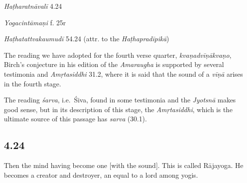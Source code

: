 \begin{ekdosis}
\begin{testimonia}[hp04_023]
\emph{Haṭharatnāvalī} 4.24
\begin{versinnote}
\end{versinnote} 

\emph{Yogacintāmaṇi} f. 25r
\begin{versinnote}
\end{versinnote}

\emph{Haṭhatattvakaumudī} 54.24 (attr. to the \emph{Haṭhapradīpikā})
\begin{versinnote}
\end{versinnote}
\end{testimonia}

\begin{philcomm}[hp04_023]
The reading we have adopted for the fourth verse quarter, \emph{kvaṇadvīṇākvaṇo}, Birch’s conjecture in his edition of the \emph{Amaraugha} is supported by several testimonia and \emph{Amṛtasiddhi} 31.2, where it is said that the sound of a \emph{vīṇā} arises in the fourth stage.

The reading \emph{śarva}, i.e.~Śiva, found in some testimonia and the \emph{Jyotsnā} makes good sense, but in its description of this stage, the \emph{Amṛtasiddhi}, which is the ultimate source of this passage has \emph{sarva} (30.1).
\end{philcomm}

\subsection*{4.24}
\begin{translation}[hp04_024]
Then the mind having become one [with the sound]. This is called Rājayoga. He becomes a creator and destroyer, an equal to a lord among yogis.%
\end{translation}


\end{ekdosis}
